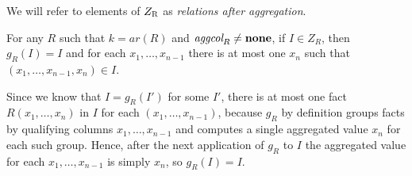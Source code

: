 We will refer to elements of $Z_\textsc{R}$ as \emph{relations after aggregation}.

\begin{lem}\label{lem:fixgr}
For any $R$ such that $k=ar(R)$ and $\textit{aggcol}_R \ne {\bf none}$, if $I \in Z_R$, then $g_R(I) = I$ and for each $x_1, \dots, x_{n-1}$ there is at most one $x_n$ such that $(x_1, \dots, x_{n-1}, x_n) \in I$.
\end{lem}
\begin{prof}
Since we know that $I = g_R(I')$ for some $I'$, there is at most one fact $R(x_1, \dots, x_n)$ in $I$ for each $(x_1, \dots, x_{n-1})$, because $g_R$ by definition groups facts by qualifying columns $x_1, \dots, x_{n-1}$ and computes a single aggregated value $x_n$ for each such group. Hence, after the next application of $g_R$ to $I$ the aggregated value for each $x_1, \dots, x_{n-1}$ is simply $x_n$, so $g_R(I) = I$.
\QEDA
\end{prof}

